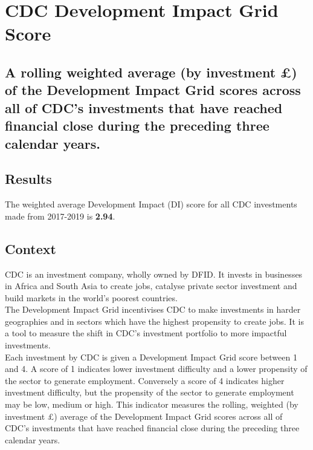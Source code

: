 \chapter{CDC Development Impact Grid Score}

\section*{A rolling weighted average (by investment \pounds) of the Development Impact Grid scores across all of CDC's investments that have reached financial close during the preceding three calendar years.}


\thispagestyle{empty}


\section{Results}

The weighted average Development Impact (DI) score for all CDC investments made from 2017-2019 is \textbf{2.94}. %

\section{Context}

CDC is an investment company, wholly owned by DFID. It invests in businesses in
Africa and South Asia to create jobs, catalyse private sector investment and build
markets in the world's poorest countries. \\%

The Development Impact Grid incentivises CDC to make investments in harder geographies and in sectors which have the highest propensity to create jobs. %
It is a tool to measure the shift in CDC's investment portfolio to more impactful investments. \\%

Each investment by CDC is given a Development Impact Grid score between 1 and 4. %
A score of 1 indicates lower investment difficulty and a lower propensity of the sector to generate employment. %
Conversely a score of 4 indicates higher investment difficulty, but the propensity of the sector to generate employment may be low, medium or high. %
This indicator measures the rolling, weighted (by investment \pounds) average of the Development Impact Grid scores across all of CDC's investments that have reached financial close during the preceding three calendar years. \\%

\newpage
